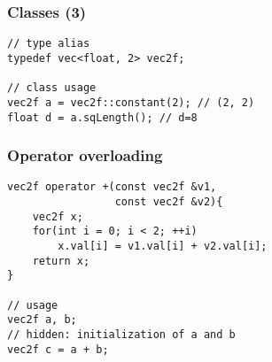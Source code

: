 \begin{frame}[fragile]
\frametitle{Classes (3)}
\begin{lstlisting}
// type alias
typedef vec<float, 2> vec2f;

// class usage
vec2f a = vec2f::constant(2); // (2, 2)
float d = a.sqLength(); // d=8
\end{lstlisting}
\end{frame}

\begin{frame}[fragile]
\frametitle{Operator overloading}
\begin{lstlisting}
vec2f operator +(const vec2f &v1,
                 const vec2f &v2){
    vec2f x;
    for(int i = 0; i < 2; ++i)
        x.val[i] = v1.val[i] + v2.val[i];
    return x;
}

// usage
vec2f a, b;
// hidden: initialization of a and b
vec2f c = a + b;
\end{lstlisting}
\end{frame}
